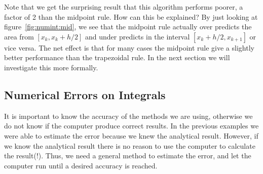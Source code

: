 \documentclass[graybox,sectrefs,envcountresetchap,open=right,final]{svmonodo}
\begin{document}
\noindent

Note that we get the surprising result that this algorithm performs poorer, a factor of 2 than the midpoint rule.
How can this be explained? By just looking at figure~\ref{fig:numint:mid}, we see that the midpoint rule actually over predicts the area from $[x_k,x_k+h/2]$ 
 and under predicts in the interval $[x_k+h/2,x_{k+1}]$ or vice versa. The net effect is that for many cases the midpoint rule give a slightly better 
 performance than the trapezoidal rule. In the next section we will investigate this more formally.

\subsection{Numerical Errors on Integrals}
It is important to know the accuracy of the methods we are using, otherwise we do not know if the
computer produce correct results. In the previous examples we were able to estimate the error because we knew the analytical result. However, if we know the 
analytical result there is no reason to use the computer to calculate the result(!). Thus, we need a general method to estimate the error, and let the computer 
run until a desired accuracy is reached. 
\end{document}
